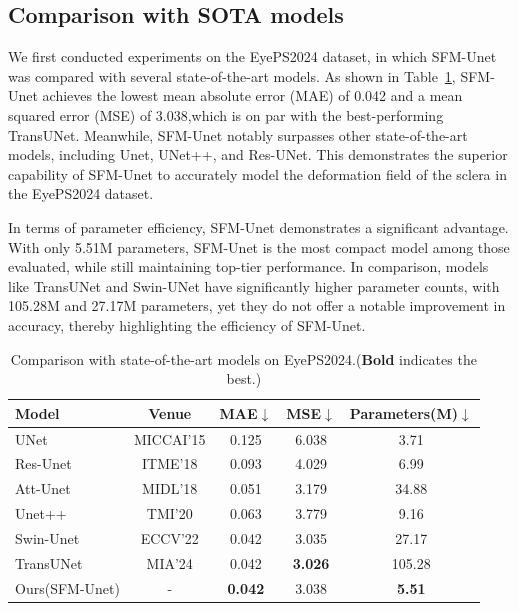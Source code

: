 \documentclass[AMA,Times1COL]{WileyNJDv5} %
\begin{document}
\subsection{Comparison with SOTA models}
We first conducted experiments on the EyePS2024 dataset, in which SFM-Unet was compared with several state-of-the-art models. As shown in Table~\ref{tab:mae_mse_comparison}, SFM-Unet achieves the lowest mean absolute error (MAE) of 0.042 and a mean squared error (MSE) of 3.038,which is on par with the best-performing TransUNet. Meanwhile, SFM-Unet notably surpasses other state-of-the-art models, including Unet, UNet++, and Res-UNet. This demonstrates the superior capability of SFM-Unet to accurately model the deformation field of the sclera in the EyePS2024 dataset.

In terms of parameter efficiency, SFM-Unet demonstrates a significant advantage. With only 5.51M parameters, SFM-Unet is the most compact model among those evaluated, while still maintaining top-tier performance. In comparison, models like TransUNet and Swin-UNet have significantly higher parameter counts, with 105.28M and 27.17M parameters, yet they do not offer a notable improvement in accuracy, thereby highlighting the efficiency of SFM-Unet.

\begin{table}[htbp]
\scriptsize
\centering
\caption{Comparison with state-of-the-art models on EyePS2024.(\textbf{Bold} indicates the best.)}
\begin{tabular}{lcccc}
\toprule
\textbf{Model} & \textbf{Venue} & \textbf{MAE$\downarrow$} & \textbf{MSE$\downarrow$}  & \textbf{Parameters(M)$\downarrow$}\\
\midrule
UNet\cite{ronneberger2015u}  & MICCAI'15   & 0.125  & 6.038 & 3.71 \\
Res-Unet\cite{xiao2018weighted} & ITME'18 & 0.093  & 4.029 & 6.99 \\
Att-Unet\cite{oktay2018attention} & MIDL'18 & 0.051  & 3.179 & 34.88 \\
Unet++\cite{zhou2019unet++} & TMI'20 & 0.063  & 3.779 & 9.16 \\
Swin-Unet\cite{cao2022swin} & ECCV'22 & 0.042  & 3.035 & 27.17 \\
TransUNet\cite{chen2024transunet} & MIA'24 & 0.042  & \textbf{3.026} & 105.28 \\
Ours(SFM-Unet) & - & \textbf{0.042}  & 3.038 & \textbf{5.51} \\
\bottomrule
\end{tabular}
\label{tab:mae_mse_comparison}
\end{table}
\end{document}
